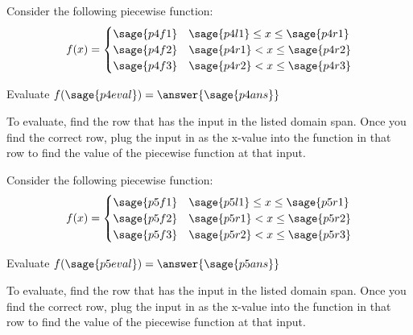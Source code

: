 \documentclass{ximera}
\begin{document}
\begin{problem}
    Consider the following piecewise function:
    \[
        f(x) =
            \begin{cases}
                \sage{p4f1}     & \sage{p4l1}\leq x \leq \sage{p4r1} \\
                \sage{p4f2}     & \sage{p4r1} < x \leq \sage{p4r2} \\
                \sage{p4f3}     & \sage{p4r2} < x \leq \sage{p4r3}
            \end{cases}
    \]
    
    Evaluate $f(\sage{p4eval}) = \answer{\sage{p4ans}}$
    \begin{feedback}
        To evaluate, find the row that has the input in the listed domain span. Once you find the correct row, plug the input in as the x-value into the function in that row to find the value of the piecewise function at that input.
    \end{feedback}
    
\end{problem}




\begin{problem}
    Consider the following piecewise function:
    \[
        f(x) =
            \begin{cases}
                \sage{p5f1}     & \sage{p5l1}\leq x \leq \sage{p5r1} \\
                \sage{p5f2}     & \sage{p5r1} < x \leq \sage{p5r2} \\
                \sage{p5f3}     & \sage{p5r2} < x \leq \sage{p5r3}
            \end{cases}
    \]
    
    Evaluate $f(\sage{p5eval}) = \answer{\sage{p5ans}}$
    \begin{feedback}
        To evaluate, find the row that has the input in the listed domain span. Once you find the correct row, plug the input in as the x-value into the function in that row to find the value of the piecewise function at that input.
    \end{feedback}
    
\end{problem}
\end{document}
